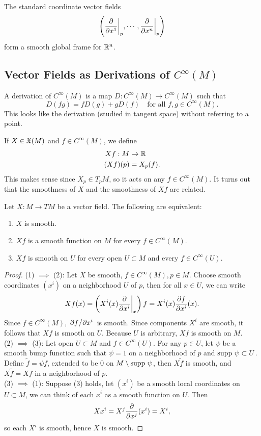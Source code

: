 \begin{example}
    The standard coordinate vector fields 
    $$\left(\pdv{}{x^1}\bigg|_{p}, \cdots, \pdv{}{x^n}\bigg|_{p}\right)$$ form a smooth global frame for $\mathbb{R}^n$. 
\end{example}



\subsection{Vector Fields as Derivations of $C^\infty(M)$}
A derivation of $C^\infty(M)$ is a map $D:C^\infty(M) \to C^\infty(M)$ such that 
$$D(fg) = fD(g) + gD(f) \quad \text{for all }f,g \in C^\infty(M). $$
This looks like the derivation (studied in tangent space) without referring to a point. 

If $X \in \mathfrak{X}(M)$ and $f \in C^\infty(M)$, we define
\begin{align*}
    Xf:M &\to \mathbb{R} \\
    (Xf)(p) &= X_p(f).
\end{align*}
This makes sense since $X_p \in T_pM$, so it acts on any $f \in C^\infty(M)$. It turns out that the smoothness of $X$ and the smoothness of $Xf$ are related. 
\begin{proposition}\label{8.14}
    Let $X:M \to TM$ be a vector field. The following are equivalent:
    \begin{enumerate}
    \item $X$ is smooth.
    \item $Xf$ is a smooth function on $M$ for every $f \in C^\infty(M)$. 
    \item $Xf$ is smooth on $U$ for every open $U \subset M$ and every $f \in C^\infty(U)$. 
    \end{enumerate}
\end{proposition}
\begin{proof}
    (1) $\implies$ (2): Let $X$ be smooth, $f \in C^\infty(M), p \in M$. Choose smooth coordinates $(x^i)$ on a neighborhood $U$ of $p$, then for all $x \in U$, we can write 
    $$ Xf(x) = \left(X^i(x)\pdv{}{x^i}\bigg|_{x}\right)f = X^i(x){\pdv{f}{x^i}}(x). $$
    Since $f \in C^\infty(M)$, $\pdv*{f}{x^i}$ is smooth. Since components $X^i$ are smooth, it follows that $Xf$ is smooth on $U$. Because $U$ is arbitrary, $Xf$ is smooth on $M$. \\
    (2) $\implies$ (3): Let open $U \subset M$ and $f \in C^\infty(U)$. For any $p \in U$, let $\psi$ be a smooth bump function such that $\psi=1$ on a neighborhood of $p$ and $\mathrm{supp~} \psi \subset U$. Define $\widetilde{f} = \psi f$, extended to be $0$ on $M \setminus \mathrm{supp~} \psi$, then $X\tilde{f}$ is smooth, and $X\tilde{f} = Xf$ in a neighborhood of $p$. \\
    (3) $\implies$ (1): Suppose (3) holds, let $(x^i)$ be a smooth local coordinates on $U \subset M$, we can think of each $x^i$ as a smooth function on $U$. Then 
    $$Xx^i = X^j {\pdv{}{x^j}}(x^i) = X^i, $$
    so each $X^i$ is smooth, hence $X$ is smooth. 
\end{proof}

